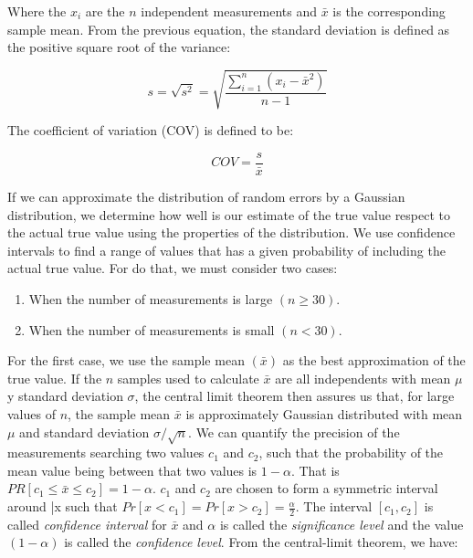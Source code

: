 \documentclass{latex/classes/thesis}
\begin{document}
Where the \(x_i\) are the \(n\) independent measurements and \(\bar{x}\) is
the corresponding sample mean. From the previous equation, the standard
deviation is defined as the positive square root of the variance:

\begin{equation}
s = \sqrt{s^2} = \sqrt{\frac{\sum_{i = 1}^n(x_i - \bar{x}^2)}{n - 1}}
\end{equation}

The coefficient of variation (COV) is defined to be:

\begin{equation}
  COV = \frac{s}{\bar{x}}
\end{equation}

If we can approximate the distribution of random errors by a Gaussian
distribution, we determine how well is our estimate of the true value respect
to the actual true value using the properties of the distribution. We use
confidence intervals to find a range of values that has a given probability
of including the actual true value. For do that, we must consider two cases:

\begin{enumerate}
\item When the number of measurements is large \((n \ge 30)\).
\item When the number of measurements is small \((n < 30)\).
\end{enumerate}

For the first case, we use the sample mean \((\bar{x})\) as the best
approximation of the true value. If the \(n\) samples used to calculate
\(\bar{x}\) are all independents with mean \(\mu\) y standard deviation
\(\sigma\), the central limit theorem then assures us that, for large values
of \(n\), the sample mean \(\bar{x}\) is approximately Gaussian distributed
with mean \(\mu\) and standard deviation \(\sigma / \sqrt{n}\). We can
quantify the precision of the measurements searching two values \(c_1\) and
\(c_2\), such that the probability of the mean value being between that two
values is \(1 - \alpha\). That is \(PR[c_1 \le \bar{x} \le c_2] = 1 -
   \alpha\). \(c_1\) and \(c_2\) are chosen to form a symmetric interval around
\bar{x} such that \(Pr[x < c_1] = Pr[x > c_2] = \frac{\alpha}{2}\). The
interval \([c_1, c_2]\) is called \emph{confidence interval} for \(\bar{x}\) and
\(\alpha\) is called the \emph{significance level} and the value \((1 - \alpha)\) is
called the \emph{confidence level}. From the central-limit theorem, we have:
\end{document}
